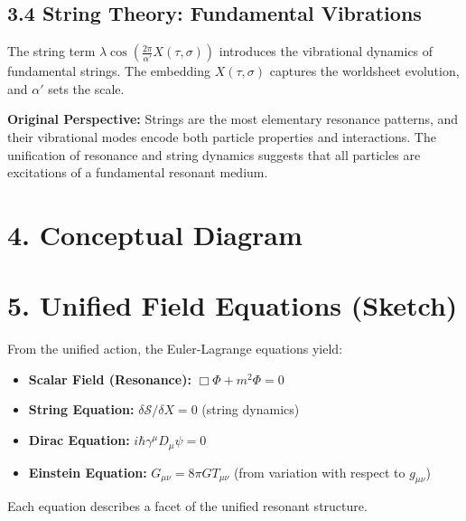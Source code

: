 \documentclass[12pt]{article}
\begin{document}
\subsection*{3.4 String Theory: Fundamental Vibrations}
The string term $\lambda \cos\left(\frac{2\pi}{\alpha'} X(\tau, \sigma)\right)$ introduces the vibrational dynamics of fundamental strings. The embedding $X(\tau, \sigma)$ captures the worldsheet evolution, and $\alpha'$ sets the scale.

\textbf{Original Perspective:}  
Strings are the most elementary resonance patterns, and their vibrational modes encode both particle properties and interactions. The unification of resonance and string dynamics suggests that all particles are excitations of a fundamental resonant medium.

\section*{4. Conceptual Diagram}
\begin{center}
\end{center}

\section*{5. Unified Field Equations (Sketch)}
From the unified action, the Euler-Lagrange equations yield:
\begin{itemize}
    \item \textbf{Scalar Field (Resonance):} $\Box \Phi + m^2 \Phi = 0$
    \item \textbf{String Equation:} $\delta \mathcal{S}/\delta X = 0$ (string dynamics)
    \item \textbf{Dirac Equation:} $i\hbar \gamma^\mu D_\mu \psi = 0$
    \item \textbf{Einstein Equation:} $G_{\mu\nu} = 8\pi G T_{\mu\nu}$ (from variation with respect to $g_{\mu\nu}$)
\end{itemize}
Each equation describes a facet of the unified resonant structure.
\end{document}
